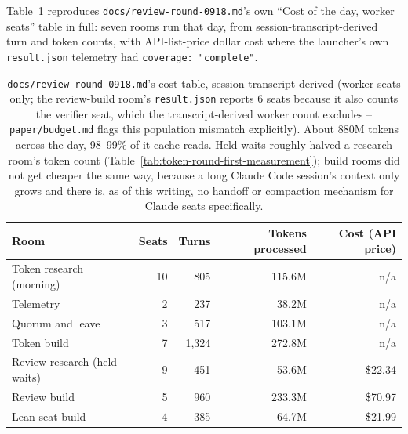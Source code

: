 Table~\ref{tab:review-round-cost} reproduces \texttt{docs/review-round-0918.md}'s own
``Cost of the day, worker seats'' table in full: seven rooms run that day, from
session-transcript-derived turn and token counts, with API-list-price dollar cost where
the launcher's own \texttt{result.json} telemetry had \texttt{coverage: "complete"}.

\begin{table}[h]
\centering
\small
\begin{tabular}{lrrrr}
\toprule
Room & Seats & Turns & Tokens processed & Cost (API price) \\
\midrule
Token research (morning) & 10 & 805 & 115.6M & n/a \\
Telemetry & 2 & 237 & 38.2M & n/a \\
Quorum and leave & 3 & 517 & 103.1M & n/a \\
Token build & 7 & 1{,}324 & 272.8M & n/a \\
Review research (held waits) & 9 & 451 & 53.6M & \$22.34 \\
Review build & 5 & 960 & 233.3M & \$70.97 \\
Lean seat build & 4 & 385 & 64.7M & \$21.99 \\
\bottomrule
\end{tabular}
\caption{\texttt{docs/review-round-0918.md}'s cost table, session-transcript-derived
(worker seats only; the review-build room's \texttt{result.json} reports 6 seats
because it also counts the verifier seat, which the transcript-derived worker count
excludes -- \texttt{paper/budget.md} flags this population mismatch explicitly). About
880M tokens across the day, 98--99\% of it cache reads. Held waits roughly halved a
research room's token count (Table~\ref{tab:token-round-first-measurement}); build rooms
did not get cheaper the same way, because a long Claude Code session's context only
grows and there is, as of this writing, no handoff or compaction mechanism for Claude
seats specifically.}
\label{tab:review-round-cost}
\end{table}


